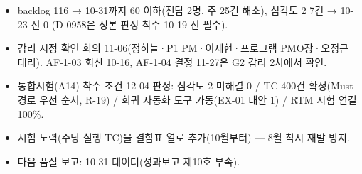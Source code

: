 \documentclass[10pt,a4paper]{article}
\begin{document}
\fieldunbreakable
\begin{fieldbox}\small
\ifwbblank
{}
\else
\begin{itemize}
\item backlog 116 → 10-31까지 60 이하(전담 2명, 주 25건 해소), 심각도 2 7건 → 10-23 전 0 (D-0958은 정본 판정 착수 10-19 전 필수).
\item 감리 시정 확인 회의 11-06(정하늘·P1 PM·이재현·프로그램 PMO장·오정근 대리). AF-1-03 회신 10-16, AF-1-04 결정 11-27은 G2 감리 2차에서 확인.
\item 통합시험(A14) 착수 조건 12-04 판정: 심각도 2 미해결 0 / TC 400건 확정(Must 경로 우선 순서, R-19) / 회귀 자동화 도구 가동(EX-01 대안 1) / RTM 시험 연결 100\%.
\item 시험 노력(주당 실행 TC)을 결함표 열로 추가(10월부터) — 8월 착시 재발 방지.
\item 다음 품질 보고: 10-31 데이터(성과보고 제10호 부속).
\end{itemize}
\fi
\end{fieldbox}
\end{document}
